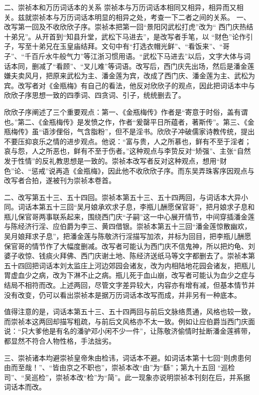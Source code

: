 \documentclass[a4paper,12pt,UTF8,twoside]{ctexbook}
\begin{document}
二、崇祯本和万历词话本的关系
崇祯本与万历词话本相同又相异，相异而又相关。兹就崇祯本与万历词话本明显的相异之处，考查一下二者之间的关系。
一、改写第一回及不收欣欣子序。崇祯本把第一回“景阳冈武松打虎”改为“ 西门庆热结十弟兄”。从开首到“知县升堂，武松下马进去”，是改写者手笔，以 “财色”论作引子，写至十弟兄在玉皇庙结拜。文句中有“打选衣帽光鲜”、“看饭来”、“哥子”、“千百斤水牛般气力”等江浙习惯用语。“武松下马进去”以后，文字大体与词话本同，删减了“看顾”、“叉儿难”等词语。改写后，西门庆先出场，然后是潘金莲嫌夫卖风月，把原来武松为主、潘金莲为宾，改成了西门庆、潘金莲为主、武松为宾。改写者对《金瓶梅》有自己的看法，他反对欣欣子的观点，因此把词话本中与欣欣子序思想一致的四季词、四贪词、引子，统统删去了。

欣欣子序阐述了三个重要观点：第一、《金瓶梅传》作者是“寄意于时俗，盖有谓也。”第二、《金瓶梅传》是发愤之作，作者“爰罄平日所蕴者，著斯传”。第三、《金瓶梅传》虽“语涉俚俗，气含脂粉”，但不是淫书。欣欣子冲破儒家诗教传统，提出不要压抑哀乐之情的进步观点。他说：“富与贵，人之所慕也，鲜有不至于淫者；哀与怨，人之所恶也，鲜有不至于伤者。”这种观点与李贽反对“矫强”、主张“自然发于性情”的反礼教思想是一致的。崇祯本改写者反对这种观点，想用“财色”论、“惩戒”说再造《金瓶梅》，因此他不收欣欣子序。而东吴弄珠客序因观点与改写者合拍，遂被刊为崇祯本卷首。

二、改写第五十三、五十四回。崇祯本第五十三、五十四两回，与词话本大异小同。词话本第五十三回“吴月娘承欢求子息，李瓶儿酬愿保官哥”，把月娘求子息和瓶儿保官哥两事联系起来，围绕西门庆“子嗣”这一中心展开情节，中间穿插潘金莲与陈经济行淫、应伯爵为李三、黄四借银。崇祯本第五十三回“潘金莲惊散幽欢，吴月娘拜求子息”，把潘金莲与陈敬济行淫描写加浓，并标为回目，把李瓶儿酬愿保官哥的情节作了大幅度删减。改写者可能认为西门庆不信鬼神，所以把灼龟、刘婆子收惊、钱痰火拜佛、西门庆谢土地、陈经济送纸马等文字都删去了。崇祯本第五十四回把词话本刘太监庄上河边郊园会诸友，改为内相陆地花园会诸友，把瓶儿胃虚血少之病，改为下淋不止之病。瓶儿死于血山崩，改写者可能认为血少之症与结局不相符而改。上述两回，尽管文字差异较大，内容亦有增有减，但基本情节并没有改变，仍可以看出崇祯本是据万历词话本改写而成，并非另有一种底本。

值得注意的是，词话本第五十三、五十四两回与前后文脉络贯通，风格也较一致，而崇祯本这两回却描写粗疏，与前后文风格亦不太一致。例如让应伯爵当西门庆面说：“只大爹他是有名的潘驴邓小闲不少一件”，让陈敬济偷情时扯断潘金莲裤带，都显然不符合人物性格，手法拙劣。

三、崇祯诸本均避崇祯皇帝朱由检讳，词话本不避。如词话本第十七回“则虏患何由而至哉！”、“皆由京之不职也”，崇祯本改“由”为“繇”；第九十五回 “巡检司”、“吴巡检”，崇祯本改“检”为“简”。此一现象亦说明崇祯本刊刻在后，并系据词话本而改。
\end{document}
